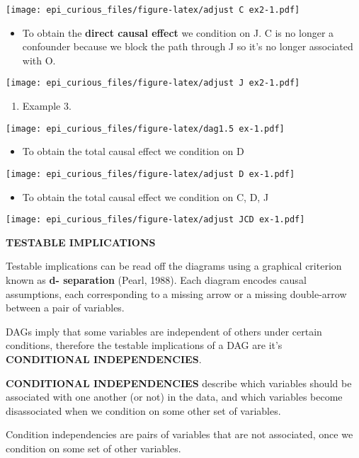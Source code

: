 \documentclass[
]{article}
\providecommand{\tightlist}{%
  \setlength{\itemsep}{0pt}\setlength{\parskip}{0pt}}
\begin{document}
\texttt{[image: epi\_curious\_files/figure-latex/adjust C ex2-1.pdf]}

\begin{itemize}
\tightlist
\item
  To obtain the \textbf{direct causal effect} we condition on J. C is no
  longer a confounder because we block the path through J so it's no
  longer associated with O.
\end{itemize}

\texttt{[image: epi\_curious\_files/figure-latex/adjust J ex2-1.pdf]}

\begin{enumerate}
\def\labelenumi{\arabic{enumi}.}
\setcounter{enumi}{2}
\tightlist
\item
  Example 3.
\end{enumerate}

\texttt{[image: epi\_curious\_files/figure-latex/dag1.5 ex-1.pdf]}

\begin{itemize}
\tightlist
\item
  To obtain the total causal effect we condition on D
\end{itemize}

\texttt{[image: epi\_curious\_files/figure-latex/adjust D ex-1.pdf]}

\begin{itemize}
\tightlist
\item
  To obtain the total causal effect we condition on C, D, J
\end{itemize}

\texttt{[image: epi\_curious\_files/figure-latex/adjust JCD ex-1.pdf]}

\textbf{TESTABLE IMPLICATIONS}

Testable implications can be read off the diagrams using a graphical
criterion known as \textbf{d- separation} (Pearl, 1988). Each diagram
encodes causal assumptions, each corresponding to a missing arrow or a
missing double-arrow between a pair of variables.

DAGs imply that some variables are independent of others under certain
conditions, therefore the testable implications of a DAG are it's
\textbf{CONDITIONAL INDEPENDENCIES}.

\textbf{CONDITIONAL INDEPENDENCIES} describe which variables should be
associated with one another (or not) in the data, and which variables
become disassociated when we condition on some other set of variables.

Condition independencies are pairs of variables that are not associated,
once we condition on some set of other variables.
\end{document}
